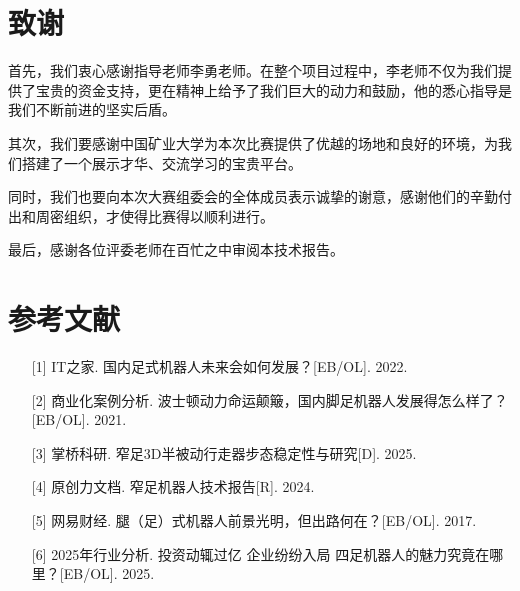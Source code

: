 \documentclass[a4paper,fontset=windows]{ctexart}
\begin{document}
\section*{致谢}
首先，我们衷心感谢指导老师李勇老师。在整个项目过程中，李老师不仅为我们提供了宝贵的资金支持，更在精神上给予了我们巨大的动力和鼓励，他的悉心指导是我们不断前进的坚实后盾。

其次，我们要感谢中国矿业大学为本次比赛提供了优越的场地和良好的环境，为我们搭建了一个展示才华、交流学习的宝贵平台。

同时，我们也要向本次大赛组委会的全体成员表示诚挚的谢意，感谢他们的辛勤付出和周密组织，才使得比赛得以顺利进行。

最后，感谢各位评委老师在百忙之中审阅本技术报告。

\section*{参考文献}
\begin{enumerate}
    \item[{[}1{]}] IT之家. 国内足式机器人未来会如何发展？{[}EB/OL{]}. 2022.
    \item[{[}2{]}] 商业化案例分析. 波士顿动力命运颠簸，国内脚足机器人发展得怎么样了？{[}EB/OL{]}. 2021.
    \item[{[}3{]}] 掌桥科研. 窄足3D半被动行走器步态稳定性与研究{[}D{]}. 2025.
    \item[{[}4{]}] 原创力文档. 窄足机器人技术报告{[}R{]}. 2024.
    \item[{[}5{]}] 网易财经. 腿（足）式机器人前景光明，但出路何在？{[}EB/OL{]}. 2017.
    \item[{[}6{]}] 2025年行业分析. 投资动辄过亿 企业纷纷入局 四足机器人的魅力究竟在哪里？{[}EB/OL{]}. 2025.
\end{enumerate}
\end{document}
